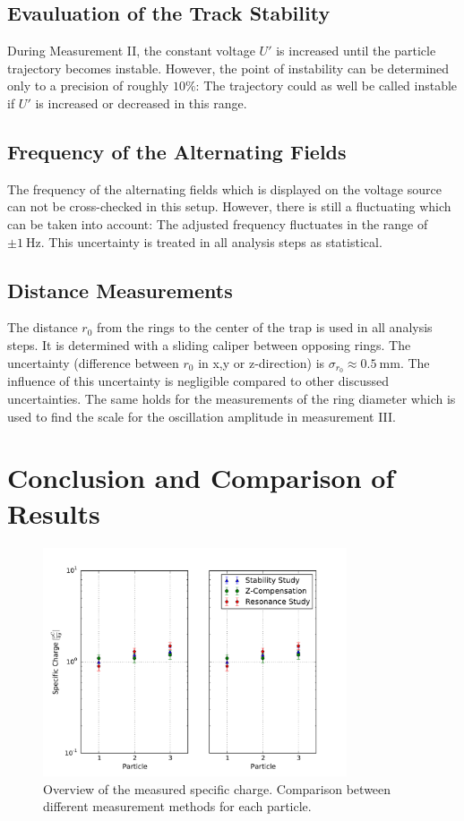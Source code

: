 \documentclass[
	paper=A4,
	parskip=full,
	chapterprefix=true,
	11pt,
	headings=normal,
	bibliography=totoc,
	listof=totoc,
	titlepage=on,
]{scrreprt}
\begin{document}
\section{Evauluation of the Track Stability}
During Measurement II, the constant voltage $U'$ is increased until the particle trajectory becomes instable. However, the point of instability can be determined only to a precision of roughly $10\%$: The trajectory could as well be called instable if $U'$ is increased or decreased in this range. 
 
\section{Frequency of the Alternating Fields}
The frequency of the alternating fields which is displayed on the voltage source can not be cross-checked in this setup. However, there is still a fluctuating which can be taken into account: The adjusted frequency fluctuates in the range of $\pm \SI{1}{\hertz}$. This uncertainty is treated in all analysis steps as statistical. 

\section{Distance Measurements}
The distance $r_0$ from the rings to the center of the trap is used in all analysis steps. It is determined with a sliding caliper between opposing rings. The uncertainty (difference between $r_0$ in x,y or z-direction) is $\sigma_{r_0} \approx \SI{0.5}{\milli \meter}$. The influence of this uncertainty is negligible compared to other discussed uncertainties. The same holds for the measurements of the ring diameter which is used to find the scale for the oscillation amplitude in measurement III.

\chapter{Conclusion and Comparison of Results}


\begin{figure}[t]
	\centering
	\includegraphics[width=0.8\textwidth]{paul_compareresults}
	\caption{Overview of the measured specific charge. Comparison between different measurement methods for each particle.}
	\label{fig:comp_results}
\end{figure}	

\cleardoublepage


{}
\end{document}
